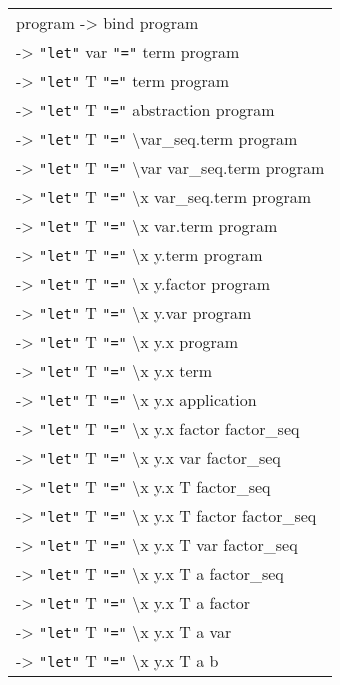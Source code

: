 \documentclass{article}
\begin{document}
\begin{flushleft}
\begin{tabular}{l}
program -> bind program \\
\quad -> \texttt{"let"} var \texttt{"="} term program \\
\quad -> \texttt{"let"} T \texttt{"="} term program \\
\quad -> \texttt{"let"} T \texttt{"="} abstraction program \\
\quad -> \texttt{"let"} T \texttt{"="} \textbackslash var\_seq.term program \\
\quad -> \texttt{"let"} T \texttt{"="} \textbackslash var var\_seq.term program \\
\quad -> \texttt{"let"} T \texttt{"="} \textbackslash x var\_seq.term program \\
\quad -> \texttt{"let"} T \texttt{"="} \textbackslash x var.term program \\
\quad -> \texttt{"let"} T \texttt{"="} \textbackslash x y.term program \\
\quad -> \texttt{"let"} T \texttt{"="} \textbackslash x y.factor program \\
\quad -> \texttt{"let"} T \texttt{"="} \textbackslash x y.var program \\
\quad -> \texttt{"let"} T \texttt{"="} \textbackslash x y.x program \\ 
\quad -> \texttt{"let"} T \texttt{"="} \textbackslash x y.x term \\
\quad -> \texttt{"let"} T \texttt{"="} \textbackslash x y.x application \\
\quad -> \texttt{"let"} T \texttt{"="} \textbackslash x y.x factor factor\_seq \\
\quad -> \texttt{"let"} T \texttt{"="} \textbackslash x y.x var factor\_seq \\
\quad -> \texttt{"let"} T \texttt{"="} \textbackslash x y.x T factor\_seq \\
\quad -> \texttt{"let"} T \texttt{"="} \textbackslash x y.x T factor factor\_seq \\
\quad -> \texttt{"let"} T \texttt{"="} \textbackslash x y.x T var factor\_seq \\
\quad -> \texttt{"let"} T \texttt{"="} \textbackslash x y.x T a factor\_seq \\
\quad -> \texttt{"let"} T \texttt{"="} \textbackslash x y.x T a factor \\
\quad -> \texttt{"let"} T \texttt{"="} \textbackslash x y.x T a var \\
\quad -> \texttt{"let"} T \texttt{"="} \textbackslash x y.x T a b
\end{tabular}
\end{flushleft}
\end{document}
